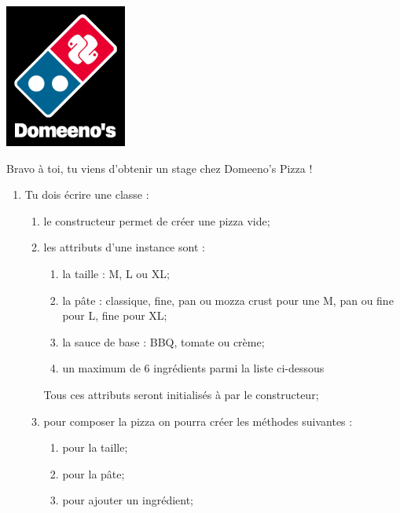 \documentclass[a4paper,12pt,french]{book}
\begin{document}
    \begin{exercice}
        \begin{center}
            \includegraphics[width=4cm]{img/domeeno}
        \end{center}
        Bravo à toi, tu viens d'obtenir un stage chez Domeeno's Pizza ! 
        
        \begin{enumerate}[\bfseries 1.]
            \item     Tu dois écrire une classe  :
            \begin{enumerate}[--]
                \item     le constructeur permet de créer une pizza \og vide\fg;
                \item     les attributs d'une instance sont :
                \begin{enumerate}[--]
                    \item     la taille : M, L ou XL;
                    \item     la pâte : classique, fine, pan ou mozza crust pour une M, pan ou fine pour L, fine pour XL;
                    \item     la sauce de base : BBQ, tomate ou crème;
                    \item     un maximum de 6 ingrédients parmi la liste ci-dessous    
                \end{enumerate}    
                Tous ces attributs seront initialisés à  par le constructeur;
                \item pour composer la pizza on pourra créer les méthodes suivantes :
                \begin{enumerate}[--]
                    \item     {} pour la taille;
                    \item     {} pour la pâte;
                    \item     {} pour ajouter un ingrédient;

\end{enumerate}
\end{enumerate}
\end{enumerate}
\end{exercice}
\end{document}

